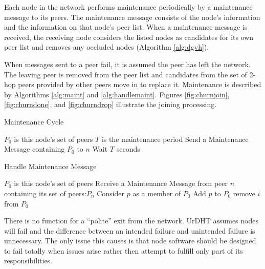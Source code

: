 Each node in the network performs maintenance periodically by a maintenance message to its peers. The maintenance message consists of the node's information and the information on that node's peer list. When a maintenance message is received, the receiving node considers the listed nodes as candidates for its own peer list and removes any occluded nodes (Algorithm \ref{alg:dgvh}). 




When messages sent to a peer fail, it is assumed the peer has left the network. The leaving peer is removed from the peer list and candidates from the set of 2-hop peers provided by other peers move in to replace it.  Maintenance is described by Algorithms \ref{alg:maint} and \ref{alg:handlemaint}.  Figures \ref{fig:churnjoin}, \ref{fig:churndone}, and \ref{fig:churndrop} illustrate the joining processing.

\begin{algorithm}
	\caption{Maintenance Cycle}
	\label{alg:maint}
	\begin{algorithmic}[1]  %
		\State $P_0$ is this node's set of peers
		\State $T$ is the maintenance period
		\State Send a Maintenance Message containing $P_0$ to $n$
		\EndFor
		\State Wait $T$ seconds
		\EndWhile
	\end{algorithmic}
\end{algorithm}


\begin{algorithm}
	\caption{Handle Maintenance Message}
	\label{alg:handlemaint}
	\begin{algorithmic}[1]  %
		\State $P_0$ is this node's set of peers
		\State Receive a Maintenance Message from peer $n$ containing its set of peers:$P_n$
		\State Consider $p$ as a member of $P_0$
		\State Add $p$ to $P_0$
		\State remove $i$ from $P_0$
		\EndIf
		\EndFor
		\EndIf
		\EndFor
	\end{algorithmic}
\end{algorithm}




There is no function for a ``polite'' exit from the network. UrDHT assumes nodes will fail and the difference between an intended failure and unintended failure is unnecessary. The only issue this causes is that node software should be designed to fail totally when issues arise rather then attempt to fulfill only part of its responsibilities.  





